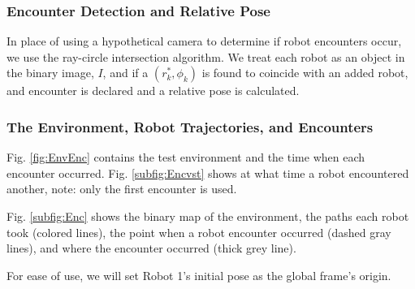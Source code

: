 \subsubsection{Encounter Detection and Relative Pose}

In place of using a hypothetical camera to determine if robot encounters occur, we use the ray-circle intersection algorithm.  We treat each robot as an object in the binary image, $I$, and if a $(r_k^*,\phi_k)$ is found to coincide with an added robot, and encounter is declared and a relative pose is calculated.  



\subsubsection{The Environment, Robot Trajectories, and Encounters}

Fig. \ref{fig:EnvEnc} contains the test environment and the time when each encounter occurred.  Fig. \ref{subfig:Encvst} shows at what time a robot encountered another, note: only the first encounter is used.

Fig. \ref{subfig:Enc} shows the binary map of the environment, the paths each robot took (colored lines), the point when a robot encounter occurred (dashed gray lines), and where the encounter occurred (thick grey line).

For ease of use, we will set Robot 1's initial pose as the global frame's origin.  

